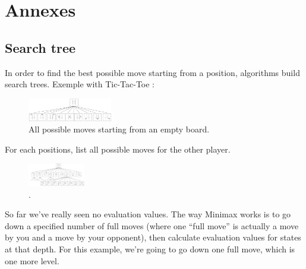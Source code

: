 \section{Annexes}
\subsection{Search tree}
In order to find the best possible move starting from a position, algorithms build search trees. 
Exemple with Tic-Tac-Toe : 
\begin{figure}[H]
	\centering
	\includegraphics[height=1cm]{5_Annexes/img/Tree1.png}
	\caption{\label{fig:tree1}All possible moves starting from an empty board.}
\end{figure}
\noindent
For each positions, list all possible moves for the other player.

\begin{figure}[H]
	\centering
	\includegraphics[height=1cm]{5_Annexes/img/Tree2.png}
	\caption{\label{fig:tree1}.}
\end{figure}
\noindent
\cite{images_annexes}
So far we've really seen no evaluation values. The way Minimax works is to go down a specified number of full moves (where one ``full move'' is actually a move by you and a move by your opponent), then calculate evaluation values for states at that depth. For this example, we're going to go down one full move, which is one more level. 

